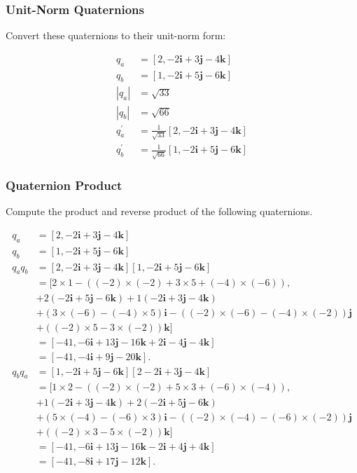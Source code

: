 \documentclass[10pt]{article}
\begin{document}
\subsubsection{Unit-Norm Quaternions}
Convert these quaternions to their unit-norm form:

$$
\begin{aligned}
q_{a} & =[2,-2 \mathbf{i}+3 \mathbf{j}-4 \mathbf{k}] \\
q_{b} & =[1,-2 \mathbf{i}+5 \mathbf{j}-6 \mathbf{k}] \\
\left|q_{a}\right| & =\sqrt{33} \\
\left|q_{b}\right| & =\sqrt{66} \\
q_{a}^{\prime} & =\frac{1}{\sqrt{33}}[2,-2 \mathbf{i}+3 \mathbf{j}-4 \mathbf{k}] \\
q_{b}^{\prime} & =\frac{1}{\sqrt{66}}[1,-2 \mathbf{i}+5 \mathbf{j}-6 \mathbf{k}]
\end{aligned}
$$

\subsubsection{Quaternion Product}
Compute the product and reverse product of the following quaternions.

$$
\begin{aligned}
q_{a} & =[2,-2 \mathbf{i}+3 \mathbf{j}-4 \mathbf{k}] \\
q_{b} & =[1,-2 \mathbf{i}+5 \mathbf{j}-6 \mathbf{k}] \\
q_{a} q_{b} & =[2,-2 \mathbf{i}+3 \mathbf{j}-4 \mathbf{k}][1,-2 \mathbf{i}+5 \mathbf{j}-6 \mathbf{k}] \\
& =[2 \times 1-((-2) \times(-2)+3 \times 5+(-4) \times(-6)), \\
& +2(-2 \mathbf{i}+5 \mathbf{j}-6 \mathbf{k})+1(-2 \mathbf{i}+3 \mathbf{j}-4 \mathbf{k}) \\
& +(3 \times(-6)-(-4) \times 5) \mathbf{i}-((-2) \times(-6)-(-4) \times(-2)) \mathbf{j} \\
& +((-2) \times 5-3 \times(-2)) \mathbf{k}] \\
& =[-41,-6 \mathbf{i}+13 \mathbf{j}-16 \mathbf{k}+2 \mathbf{i}-4 \mathbf{j}-4 \mathbf{k}] \\
& =[-41,-4 \mathbf{i}+9 \mathbf{j}-20 \mathbf{k}] . \\
q_{b} q_{a} & =[1,-2 \mathbf{i}+5 \mathbf{j}-6 \mathbf{k}][2-2 \mathbf{i}+3 \mathbf{j}-4 \mathbf{k}] \\
& =[1 \times 2-((-2) \times(-2)+5 \times 3+(-6) \times(-4)), \\
& +1(-2 \mathbf{i}+3 \mathbf{j}-4 \mathbf{k})+2(-2 \mathbf{i}+5 \mathbf{j}-6 \mathbf{k}) \\
& +(5 \times(-4)-(-6) \times 3) \mathbf{i}-((-2) \times(-4)-(-6) \times(-2)) \mathbf{j} \\
& +((-2) \times 3-5 \times(-2)) \mathbf{k}] \\
& =[-41,-6 \mathbf{i}+13 \mathbf{j}-16 \mathbf{k}-2 \mathbf{i}+4 \mathbf{j}+4 \mathbf{k}] \\
& =[-41,-8 \mathbf{i}+17 \mathbf{j}-12 \mathbf{k}] .
\end{aligned}
$$
\end{document}
